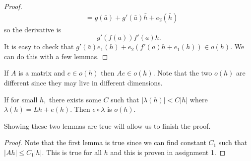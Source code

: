 \begin{itemize}
\begin{proof}
\begin{align}
            &=g(\bar{a}) + g'(\bar{a})\bar{h} + e_2(\bar{h})
        \end{align}
        so the derivative is 
        \begin{equation}
            g'(f(a))f'(a)h.
        \end{equation}
        It is easy to check that $g'(\bar{a})e_1(h)+e_2(f'(a)h+e_1(h)) \in o(h).$ We can do this with a few lemmas.
    \end{proof}
    \begin{lemma}
        If $A$ is a matrix and $e\in o(h)$ then $Ae \in o(h).$ Note that the two $o(h)$ are different since they may live in different dimensions.        
    \end{lemma}
    \begin{lemma}
        If for small $h,$ there exists some $C$ such that $|\lambda(h)| < C|h|$ where $\lambda(h) = Lh + e(h).$ Then $e\circ \lambda$ is $o(h)$.
    \end{lemma}
    Showing these two lemmas are true will allow us to finish the proof.
    \begin{proof}
        Note that the first lemma is true since we can find constant $C_1$ such that $|Ah| \le C_1|h|.$ This is true for all $h$ and this is proven in assignment 1.
        \vspace{2mm}


\end{proof}
\end{itemize}
